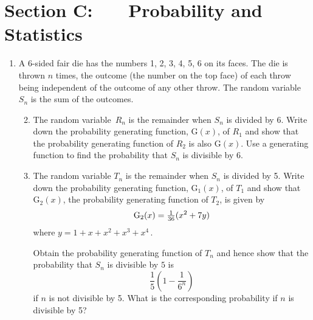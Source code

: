 \documentclass[a4, 11pt]{report}
\newlength{\qspace}
\newcounter{qnumber}
\newenvironment{question}%
 {\vspace{\qspace}
  \begin{enumerate}[\bfseries 1\quad][10]%
    \setcounter{enumi}{\value{qnumber}}%
    \item%
 }
{
  \end{enumerate}
  \filbreak
  \stepcounter{qnumber}
 }
\newenvironment{questionparts}[1][1]%
 {
  \begin{enumerate}[\bfseries (i)]%
    \setcounter{enumii}{#1}
    \addtocounter{enumii}{-1}
    \setlength{\itemsep}{5mm}
    \setlength{\parskip}{8pt}
 }
 {
  \end{enumerate}
 }
\def\G{{\mathrm G}}
\renewcommand{\.}[1]{\ensuremath{\mathrm{#1}}}
\newcommand{\+}[1]{\ensuremath{\mathbf{#1}}}
\begin{document}
	
	\newpage
\section*{Section C: \ \ \ Probability and Statistics}


\begin{question}
A 6-sided fair die has the numbers 1,  2, 3, 4, 5, 6  on its faces. The die is  thrown $n$ times, the outcome (the number on the top face) of each throw being independent of the outcome of any other throw. The random variable $S_n$
 is the sum of the outcomes.

\begin{questionparts}
\item The random variable~$R_n$ is the remainder when $S_n$ is divided by 6. Write down the probability generating function, $\G(x)$, of $R_1$ and show that the probability generating function of $R_2$ is also $\G(x)$. Use a generating function to find the probability that $S_n$ is divisible by 6.



\item The random variable $T_n$ is  the remainder when $S_n$ is divided by 5. Write down the probability generating function, $\G_1(x)$, of $T_1$ and show that $\G_2(x)$, the probability generating function of $T_2$, is given by 
\[
{\rm G}_2(x) = \tfrac 1 {36} (x^2 +7y) 
\]
where $y= 1+x+x^2+x^3+x^4\,$.

Obtain the probability generating function of  $T_n$ and hence show that the probability that $S_n$ is divisible by $5$ is 
\[
\frac15\left(1- \frac1 {6^n}\right)
\]
if $n$ is not divisible by 5. What is the corresponding probability if $n$ is divisible by 5?
\end{questionparts}
\end{question}
\end{document}
